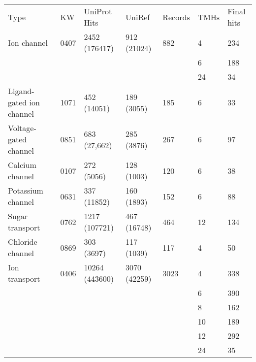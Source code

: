 \begin{table}[htbp]
\begin{tabular}{lllllll}
  Type                     & KW & UniProt Hits   & UniRef &  Records & TMHs & Final hits \\
  Ion channel              & 0407            & 2452 (176417)  & 912 (21024)            & 882                & 4    & 234        \\
                           &                    &                &                        &                    & 6    & 188        \\
                           &                    &                &                        &                    & 24   & 34         \\
  Ligand-gated ion channel & 1071            & 452 (14051)    & 189 (3055)             & 185                & 6    & 33         \\
  Voltage\--gated channel    & 0851            & 683 (27,662)   & 285 (3876)             & 267                & 6    & 97         \\
  Calcium channel          & 0107            & 272 (5056)     & 128 (1003)             & 120                & 6    & 38         \\
  Potassium channel        & 0631            & 337 (11852)    & 160 (1893)             & 152                & 6    & 88         \\
  Sugar transport          & 0762            & 1217 (107721)  & 467 (16748)            & 464                & 12   & 134        \\
  Chloride channel         & 0869            & 303 (3697)     & 117 (1039)             & 117                & 4    & 50         \\
  Ion transport            & 0406            & 10264 (443600) & 3070 (42259)           & 3023               & 4    & 338        \\
                           &                    &                &                        &                    & 6    & 390        \\
                           &                    &                &                        &                    & 8    & 162        \\
                           &                    &                &                        &                    & 10   & 189        \\
                           &                    &                &                        &                    & 12   & 292        \\
                           &                    &                &                        &                    & 24   & 35
\end{tabular}
\label{table:datasetsizes}
\end{table}


